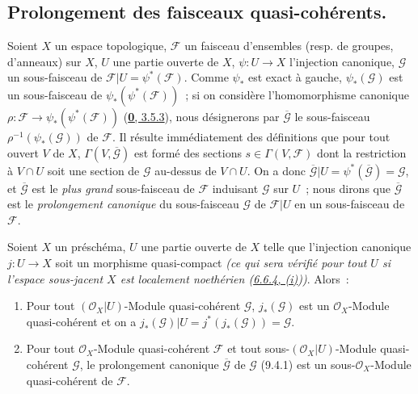 
\subsection{Prolongement des faisceaux quasi-cohérents.}
\label{subsection:I.9.4-fr}

\begin{env}[9.4.1]
\label{I.9.4.1-fr}
Soient $X$ un espace topologique, $\mathscr{F}$ un faisceau d'ensembles
(resp. de groupes, d'anneaux) sur $X$, $U$ une partie ouverte de $X$,
$\psi:U\to X$ l'injection canonique, $\mathscr{G}$ un sous-faisceau de
$\mathscr{F}|U=\psi^*(\mathscr{F})$. Comme $\psi_*$ est exact à gauche,
$\psi_*(\mathscr{G})$ est un sous-faisceau de
$\psi_*(\psi^*(\mathscr{F}))$~; si on considère l'homomorphisme canonique
$\rho:\mathscr{F}\to\psi_*(\psi^*(\mathscr{F}))$
(\hyperref[0.3.5.3-fr]{\textbf{0}, 3.5.3}), nous désignerons par
$\overline{\mathscr{G}}$ le sous-faisceau
$\rho^{-1}(\psi_*(\mathscr{G}))$ de $\mathscr{F}$. Il résulte immédiatement
des définitions que pour tout ouvert $V$ de $X$,
$\Gamma(V,\overline{\mathscr{G}})$ est formé des sections
$s\in\Gamma(V,\mathscr{F})$ dont la restriction à $V\cap U$ soit une section
de $\mathscr{G}$ au-dessus de $V\cap U$. On a donc
$\overline{\mathscr{G}}|U=\psi^*(\overline{\mathscr{G}})=\mathscr{G}$, et
$\overline{\mathscr{G}}$ est le \emph{plus grand} sous-faisceau de
$\mathscr{F}$ induisant $\mathscr{G}$ sur $U$~; nous dirons que
$\overline{\mathscr{G}}$ est le \emph{prolongement canonique} du
sous-faisceau $\mathscr{G}$ de $\mathscr{F}|U$ en un sous-faisceau de
$\mathscr{F}$.
\end{env}

\begin{proposition}[9.4.2]
\label{I.9.4.2-fr}
Soient $X$ un préschéma, $U$ une partie ouverte de $X$ telle que l'injection
canonique $j:U\to X$ soit un morphisme quasi-compact
\emph{(ce qui sera vérifié pour \emph{tout} $U$ si l'espace sous-jacent $X$
est \emph{localement noethérien}
(\hyperref[I.6.6.4-fr]{6.6.4, (i)}))}. Alors~:
\begin{enumerate}
\item[\textup{(i)}] Pour tout $(\mathscr{O}_X|U)$-Module quasi-cohérent
  $\mathscr{G}$, $j_*(\mathscr{G})$ est un $\mathscr{O}_X$-Module
  quasi-cohérent et on a
  $j_*(\mathscr{G})|U=j^*(j_*(\mathscr{G}))=\mathscr{G}$.
\item[\textup{(ii)}] Pour tout $\mathscr{O}_X$-Module quasi-cohérent $\mathscr{F}$ et
  tout sous-$(\mathscr{O}_X|U)$-Module quasi-cohérent $\mathscr{G}$, le
  prolongement canonique $\overline{\mathscr{G}}$ de $\mathscr{G}$ \textup{(9.4.1)}
  est un sous-$\mathscr{O}_X$-Module quasi-cohérent de $\mathscr{F}$.
\end{enumerate}
\end{proposition}

